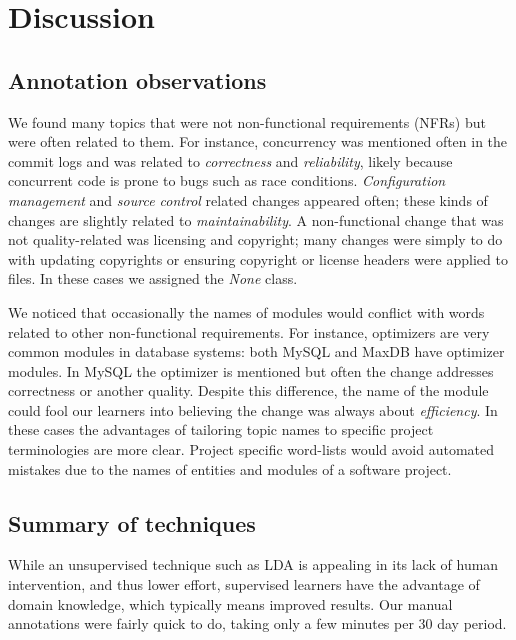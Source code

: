 \documentclass[]{sig-alternate}
\begin{document}
\section{Discussion}
\label{sec:limit}

\subsection{Annotation observations}
We found many topics that were not non-functional requirements (NFRs) but were often related to them. 
For instance, concurrency was mentioned often in the commit logs and was related to \emph{correctness} and \emph{reliability}, likely because concurrent code is prone to bugs such as race conditions. %
\emph{Configuration management} and \emph{source control} related changes appeared often; %
these kinds of changes are slightly related to \emph{maintainability}. 
A non-functional change that was not quality-related was licensing and copyright; many changes were simply to do with updating copyrights or ensuring copyright or license headers were applied to files. In these cases we assigned the \emph{None} class.

We noticed that occasionally the names of modules would conflict with words related to other non-functional requirements. 
For instance, optimizers are very common modules in database systems: both MySQL and MaxDB have optimizer modules. 
In MySQL the optimizer is mentioned but often the change addresses  correctness or another quality. 
Despite this difference, the name of the module could fool our learners into believing the change was always about \emph{efficiency}. 
In these cases the advantages of tailoring topic names to specific project terminologies are more clear. 
Project specific word-lists would avoid automated mistakes due to the names of entities and modules of a software project.

\subsection{Summary of techniques}
While an unsupervised technique such as LDA is appealing in its lack of human intervention, and thus lower effort, 
supervised learners have the advantage of domain knowledge, which typically means improved results. 
Our manual annotations were fairly quick to do, taking only a few minutes per 30 day period. 
\end{document}
